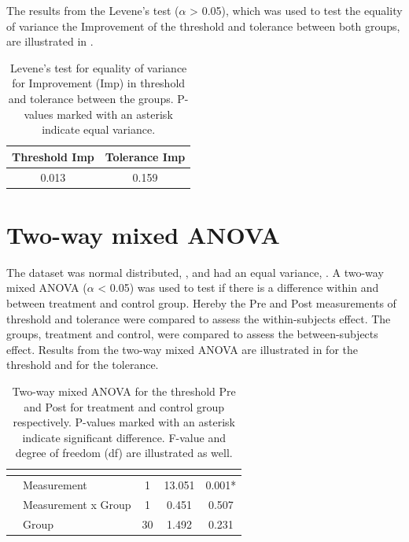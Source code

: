 The results from the Levene's test ($\alpha$ > 0.05), which was used to test the equality of variance  the Improvement of the threshold and tolerance between both groups, are illustrated in .

\begin{longtable} {c|c}
\caption{Levene's test for equality of variance for Improvement (Imp) in threshold and tolerance between the groups. P-values marked with an asterisk indicate equal variance.}
	\label{tab:Levene2} \\ 
\cellcolor[HTML]{C0C0C0} {\textbf{Threshold Imp}} & \cellcolor[HTML]{C0C0C0} {\textbf{Tolerance Imp}} \\ \hline
 0.013 & 0.159 \\ \hline
\end{longtable}
\vspace{-.5cm}

\section{Two-way mixed ANOVA}
The dataset was normal distributed, , and had an equal variance, . A two-way mixed ANOVA ($\alpha$ < 0.05) was used to test if there is a difference within and between treatment and control group. Hereby the Pre and Post measurements of threshold and tolerance were compared to assess the within-subjects effect. The groups, treatment and control, were compared to assess the between-subjects effect. Results from the two-way mixed ANOVA are illustrated in  for the threshold and  for the tolerance. 

\begin{longtable} {l|l|c|c|c}
\caption{Two-way mixed ANOVA for the threshold Pre and Post for treatment and control group respectively. P-values marked with an asterisk indicate significant difference. F-value and degree of freedom (df) are illustrated as well.}
	\label{tab:ANOVA1} \\
  \cellcolor[HTML]{C0C0C0}{} &  \cellcolor[HTML]{C0C0C0}{} & \multicolumn{1}{c|}{ \cellcolor[HTML]{C0C0C0}{\textbf{df}}} &
 \multicolumn{1}{c|}{ \cellcolor[HTML]{C0C0C0}{\textbf{F}}} & \multicolumn{1}{c}{ \cellcolor[HTML]{C0C0C0}{\textbf{P-value}}} \\ \hline  
\cellcolor[HTML]{C0C0C0} & Measurement & 1 & 13.051 & 0.001* \\ \cline{2-5}
\cellcolor[HTML]{C0C0C0}\multirow{-2}{*}{\textbf{Within-Subjects effect}} & Measurement x Group & 1 & 0.451 & 0.507  \\ \hline
\cellcolor[HTML]{C0C0C0}{\textbf{Between-Subjects effect}} & Group & 30 & 1.492 & 0.231 \\ \hline
\end{longtable}
\vspace{-.5cm}

